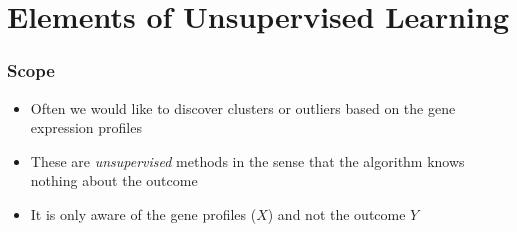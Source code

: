 \documentclass[xcolor=x11names,compress]{beamer}\usepackage[]{graphicx}\usepackage[]{color}
\begin{document}



\section[Class Discovery]{Elements of Unsupervised Learning}

\begin{frame}
  \frametitle{Scope}
  \begin{itemize}
\item Often we would like to discover clusters or outliers based on the
      gene expression profiles
\item These are {\it unsupervised} methods in the sense that the algorithm
      knows nothing about the outcome 
\item It is only aware of the gene profiles
  ($X$) and not the outcome $Y$
\end{itemize}
\end{frame}
\end{document}
